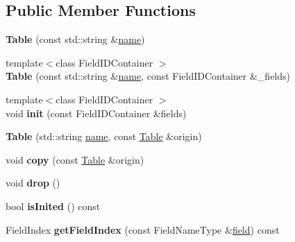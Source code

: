 \subsection*{Public Member Functions}
\begin{DoxyCompactItemize}
\item 
\mbox{\label{class_table_a875b5199dcecbdf2a2430856e4761d6b}} 
{\bfseries Table} (const std\+::string \&\hyperlink{class_table_aac2cc68c2c50c66f7de7656fa495fc2a}{name})
\item 
\mbox{\label{class_table_aeb192735d371cc146836b7a4c1fe627c}} 
{\footnotesize template$<$class Field\+I\+D\+Container $>$ }\\{\bfseries Table} (const std\+::string \&\hyperlink{class_table_aac2cc68c2c50c66f7de7656fa495fc2a}{name}, const Field\+I\+D\+Container \&\+\_\+fields)
\item 
\mbox{\label{class_table_a56b5ff78a58e18398f8c36fac93b21d7}} 
{\footnotesize template$<$class Field\+I\+D\+Container $>$ }\\void {\bfseries init} (const Field\+I\+D\+Container \&fields)
\item 
\mbox{\label{class_table_a9efda1846fa5fe1e1c11e79896c26211}} 
{\bfseries Table} (std\+::string \hyperlink{class_table_aac2cc68c2c50c66f7de7656fa495fc2a}{name}, const \hyperlink{class_table}{Table} \&origin)
\item 
\mbox{\label{class_table_a9d36a9931085cb0626c4c3361a5470b6}} 
void {\bfseries copy} (const \hyperlink{class_table}{Table} \&origin)
\item 
\mbox{\label{class_table_a5b8b8c25efea1b8da70b223cf9829c1a}} 
void {\bfseries drop} ()
\item 
\mbox{\label{class_table_ae2c8c050e99e9f85fd543a1768baa3a7}} 
bool {\bfseries is\+Inited} () const
\item 
\mbox{\label{class_table_aa7527dfb6c0bf79d75dcb18e85fba8ff}} 
Field\+Index {\bfseries get\+Field\+Index} (const Field\+Name\+Type \&\hyperlink{class_table_ab68bc133d1d01f516d0bfb1a9c06e40f}{field}) const
\item 
\mbox{\label{class_table_a4abc8b47696c07171b014c08c4df49b7}} 

\end{DoxyCompactItemize}
